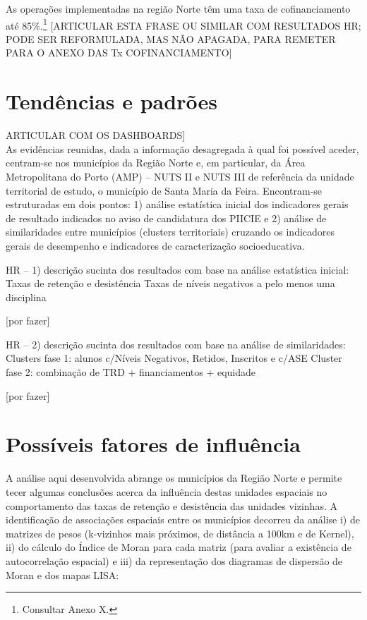 \documentclass[
]{book}
\begin{document}
As operações implementadas na região Norte têm uma taxa de cofinanciamento até 85\%.\footnote{Consultar Anexo X.}
{[}ARTICULAR ESTA FRASE OU SIMILAR COM RESULTADOS HR; PODE SER REFORMULADA, MAS NÃO APAGADA, PARA REMETER PARA O ANEXO DAS Tx COFINANCIAMENTO{]}

\hypertarget{tenduxeancias-e-padruxf5es}{%
\section{Tendências e padrões}\label{tenduxeancias-e-padruxf5es}}

ARTICULAR COM OS DASHBOARDS{]}\\
As evidências reunidas, dada a informação desagregada à qual foi possível aceder, centram-se nos municípios da Região Norte e, em particular, da Área Metropolitana do Porto (AMP) -- NUTS II e NUTS III de referência da unidade territorial de estudo, o município de Santa Maria da Feira. Encontram-se estruturadas em dois pontos: 1) análise estatística inicial dos indicadores gerais de resultado indicados no aviso de candidatura dos PIICIE e 2) análise de similaridades entre municípios (clusters territoriais) cruzando os indicadores gerais de desempenho e indicadores de caracterização socioeducativa.

HR -- 1) descrição sucinta dos resultados com base na análise estatística inicial:\\
Taxas de retenção e desistência
Taxas de níveis negativos a pelo menos uma disciplina

{[}por fazer{]}

HR -- 2) descrição sucinta dos resultados com base na análise de similaridades:
Clusters fase 1: alunos c/Níveis Negativos, Retidos, Inscritos e c/ASE
Cluster fase 2: combinação de TRD + financiamentos + equidade

{[}por fazer{]}

\hypertarget{possuxedveis-fatores-de-influuxeancia}{%
\section{Possíveis fatores de influência}\label{possuxedveis-fatores-de-influuxeancia}}

A análise aqui desenvolvida abrange os municípios da Região Norte e permite tecer algumas conclusões acerca da influência destas unidades espaciais no comportamento das taxas de retenção e desistência das unidades vizinhas. A identificação de associações espaciais entre os municípios decorreu da análise i) de matrizes de pesos (k-vizinhos mais próximos, de distância a 100km e de Kernel), ii) do cálculo do Índice de Moran para cada matriz (para avaliar a existência de autocorrelação espacial) e iii) da representação dos diagramas de dispersão de Moran e dos mapas LISA:
\end{document}
